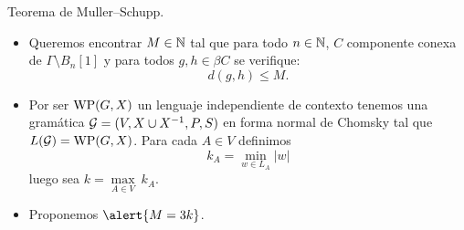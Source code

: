 \documentclass[aspectratio=169, 10pt]{beamer}
\begin{document}
	\begin{frame}[fragile]{Teorema de Muller--Schupp.}
		\begin{itemize}
			\item Queremos encontrar $M \in \mathbb{N}$ tal que para todo $n \in \mathbb{N}$, $C$ componente conexa de $\Gamma \setminus B_{n}[1]$
			y para todos $g,h \in \beta C$ se verifique:
			\[
				d(g,h) \le M.
			\]
			\pause 
			\item Por ser $\text{WP}(G, X)$ un lenguaje independiente de contexto tenemos una gramática ${\cal G} = (V,X \cup X^{-1}, P, S)$ en forma normal de Chomsky 
			tal que $L({\cal G}) = \text{WP}(G, X)$.
			\pause 
			Para cada $A \in V$ definimos 
			\[
				k_{A} = \underset{w \in L_{A}}{\min} |w|
			\]
			\pause 
			luego sea $k = \underset{A \in V}{\max} \ k_{A}$.
			\pause 
			\item Proponemos $\alert{M = 3k}$.
		\end{itemize}
	\end{frame}
\end{document}
